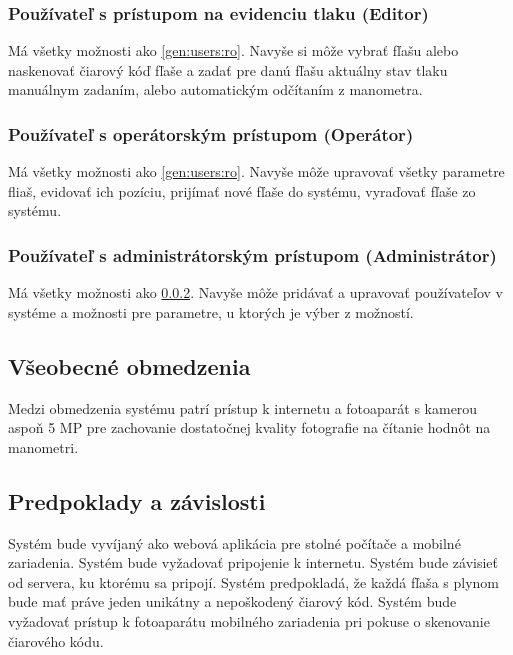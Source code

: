 \documentclass{zah}
\begin{document}
\subsubsection{Používateľ s prístupom na evidenciu tlaku (Editor)}
\label{gen:users:meter}

Má všetky možnosti ako \ref{gen:users:ro}. Navyše si môže vybrať fľašu alebo naskenovať čiarový kóď fľaše a zadať pre danú fľašu aktuálny stav tlaku manuálnym zadaním, alebo automatickým odčítaním z manometra.

\subsubsection{Používateľ s operátorským prístupom (Operátor)}
\label{gen:users:operator}

Má všetky možnosti ako \ref{gen:users:ro}. Navyše môže upravovať všetky parametre fliaš, evidovať ich pozíciu, prijímať nové fľaše do systému, vyraďovať fľaše zo systému.

\subsubsection{Používateľ s administrátorským prístupom (Administrátor)}
\label{gen:users:admin}

Má všetky možnosti ako \ref{gen:users:operator}. Navyše môže pridávať a upravovať používateľov v systéme a možnosti pre parametre, u ktorých je výber z možností.

\subsection{Všeobecné obmedzenia}
\label{gen:constraints}

Medzi obmedzenia systému patrí prístup k internetu a fotoaparát s kamerou aspoň 5 MP pre zachovanie dostatočnej kvality fotografie na čítanie hodnôt na manometri. 

\subsection{Predpoklady a závislosti}
\label{gen:deps}

Systém bude vyvíjaný ako webová aplikácia pre stolné počítače a mobilné zariadenia. Systém bude vyžadovať pripojenie k internetu. Systém bude závisieť od servera, ku ktorému sa pripojí. Systém predpokladá, že každá fľaša s plynom bude mať práve jeden unikátny a nepoškodený čiarový kód. Systém bude vyžadovať prístup k fotoaparátu mobilného zariadenia pri pokuse o skenovanie čiarového kódu.
\end{document}
